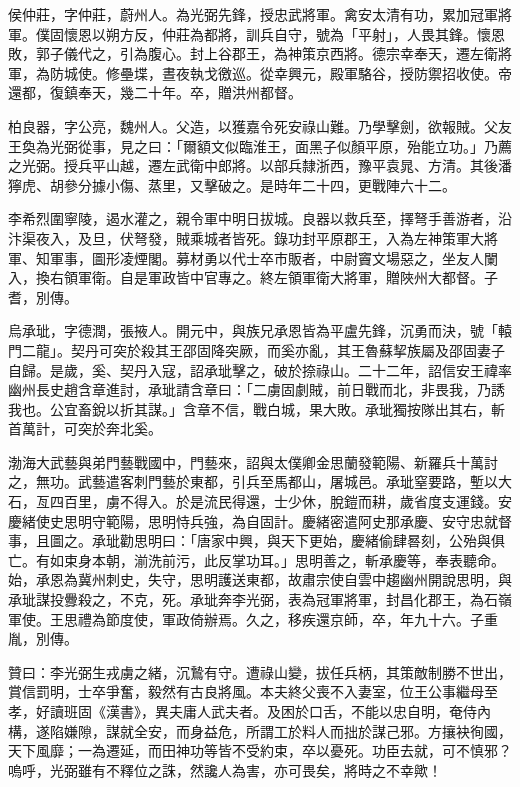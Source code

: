 \begin{pinyinscope}
 侯仲莊，字仲莊，蔚州人。為光弼先鋒，授忠武將軍。禽安太清有功，累加冠軍將軍。僕固懷恩以朔方反，仲莊為都將，訓兵自守，號為「平射」，人畏其鋒。懷恩敗，郭子儀代之，引為腹心。封上谷郡王，為神策京西將。德宗幸奉天，遷左衛將軍，為防城使。修壘堞，晝夜執戈徼巡。從幸興元，殿軍駱谷，授防禦招收使。帝還都，復鎮奉天，幾二十年。卒，贈洪州都督。



 柏良器，字公亮，魏州人。父造，以獲嘉令死安祿山難。乃學擊劍，欲報賊。父友王奐為光弼從事，見之曰：「爾額文似臨淮王，面黑子似顏平原，殆能立功。」乃薦之光弼。授兵平山越，遷左武衛中郎將。以部兵隸浙西，豫平袁晁、方清。其後潘獰虎、胡參分據小傷、蒸里，又擊破之。是時年二十四，更戰陣六十二。



 李希烈圍寧陵，遏水灌之，親令軍中明日拔城。良器以救兵至，擇弩手善游者，沿汴渠夜入，及旦，伏弩發，賊乘城者皆死。錄功封平原郡王，入為左神策軍大將軍、知軍事，圖形凌煙閣。募材勇以代士卒市販者，中尉竇文場惡之，坐友人闌入，換右領軍衛。自是軍政皆中官專之。終左領軍衛大將軍，贈陜州大都督。子耆，別傳。



 烏承玼，字德潤，張掖人。開元中，與族兄承恩皆為平盧先鋒，沉勇而決，號「轅門二龍」。契丹可突於殺其王邵固降突厥，而奚亦亂，其王魯蘇挈族屬及邵固妻子自歸。是歲，奚、契丹入寇，詔承玼擊之，破於捺祿山。二十二年，詔信安王禕率幽州長史趙含章進討，承玼請含章曰：「二虜固劇賊，前日戰而北，非畏我，乃誘我也。公宜畜銳以折其謀。」含章不信，戰白城，果大敗。承玼獨按隊出其右，斬首萬計，可突於奔北奚。



 渤海大武藝與弟門藝戰國中，門藝來，詔與太僕卿金思蘭發範陽、新羅兵十萬討之，無功。武藝遣客刺門藝於東都，引兵至馬都山，屠城邑。承玼窒要路，塹以大石，亙四百里，虜不得入。於是流民得還，士少休，脫鎧而耕，歲省度支運錢。安慶緒使史思明守範陽，思明恃兵強，為自固計。慶緒密遣阿史那承慶、安守忠就督事，且圖之。承玼勸思明曰：「唐家中興，與天下更始，慶緒偷肆晷刻，公殆與俱亡。有如束身本朝，湔洗前污，此反掌功耳。」思明善之，斬承慶等，奉表聽命。始，承恩為冀州刺史，失守，思明護送東都，故肅宗使自雲中趨幽州開說思明，與承玼謀投釁殺之，不克，死。承玼奔李光弼，表為冠軍將軍，封昌化郡王，為石嶺軍使。王思禮為節度使，軍政倚辦焉。久之，移疾還京師，卒，年九十六。子重胤，別傳。



 贊曰：李光弼生戎虜之緒，沉鷙有守。遭祿山變，拔任兵柄，其策敵制勝不世出，賞信罰明，士卒爭奮，毅然有古良將風。本夫終父喪不入妻室，位王公事繼母至孝，好讀班固《漢書》，異夫庸人武夫者。及困於口舌，不能以忠自明，奄侍內構，遂陷嫌隙，謀就全安，而身益危，所謂工於料人而拙於謀己邪。方攘袂徇國，天下風靡；一為遷延，而田神功等皆不受約束，卒以憂死。功臣去就，可不慎邪？嗚呼，光弼雖有不釋位之誅，然讒人為害，亦可畏矣，將時之不幸歟！



\end{pinyinscope}